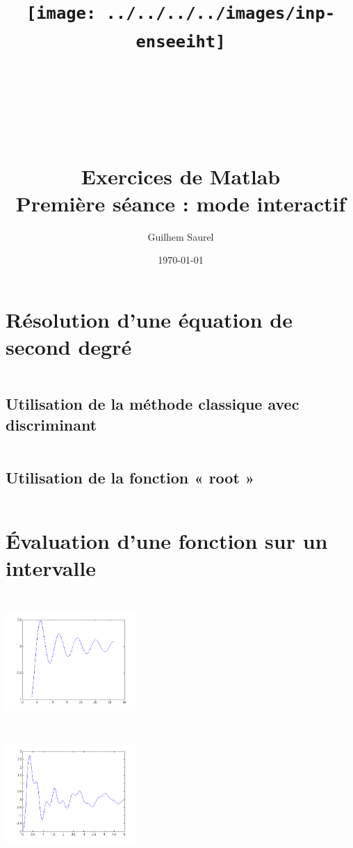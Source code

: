 \documentclass[10pt]{article}
\title{\texttt{[image: ../../../../images/inp-enseeiht]} \\ ~ \\ ~ \\ ~ \\ ~ \\ Exercices de Matlab \\ Première séance : mode interactif }
\author{Guilhem Saurel}
\date{\today}
\begin{document}
 \begin{titlepage}
  \maketitle
  \tableofcontents
 \end{titlepage}

 \section{Résolution d’une équation de second degré}
 
  \inputminted[linenos,firstnumber=1,firstline=1,lastline=2]{matlab}{un.m}
  \subsection{Utilisation de la méthode classique avec discriminant}
   \inputminted[linenos,firstnumber=3,firstline=3,lastline=6]{matlab}{un.m}
  \subsection{Utilisation de la fonction « root »}
   \inputminted[linenos,firstnumber=7,firstline=9,lastline=9]{matlab}{un.m}

 \section{Évaluation d’une fonction sur un intervalle}
  \subsection{}
   \inputminted[linenos,firstnumber=10,firstline=10,lastline=13]{matlab}{un.m}
   \includegraphics[width=5cm]{2A}
  \subsection{}
   \inputminted[linenos,firstnumber=14,firstline=14,lastline=17]{matlab}{un.m}
   \includegraphics[width=5cm]{2B}
\end{document}
